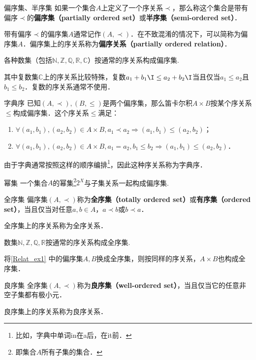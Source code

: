 \begin{definition}{偏序集、半序集}
如果一个集合$A$上定义了一个序关系$\prec$，那么称这个集合是带有偏序$\prec$的\textbf{偏序集（partially ordered set）}或\textbf{半序集（semi-ordered set）}．
\end{definition}

带有偏序$\prec$的偏序集$A$通常记作$(A,\prec)$．在不致混淆的情况下，可以简称为偏序集$A$．偏序集上的序关系称为\textbf{偏序关系（partially ordered relation）}．

\begin{example}{}
各种数集（包括$\mathbb{N},\mathbb{Z},\mathbb{Q},\mathbb{R},\mathbb{C}$）按通常的序关系构成偏序集.

其中复数集$\mathbb{C}$上的序关系比较特殊，复数$a_1+b_1\I \leq a_2+b_2\I$当且仅当$a_1\leq a_2$且$b_1 \leq b_2$．复数的序关系通常不使用．
\end{example}
\begin{example}{字典序}\label{Relat_ex1}
已知$(A,\prec),(B,\leq)$是两个偏序集，那么笛卡尔积$A\times B$按某个序关系$\leqslant$构成偏序集．这个序关系$\leqslant$满足：
\begin{enumerate}
\item $\forall(a_1,b_1),(a_2,b_2) \in A\times B, a_1\prec a_2 \Rightarrow (a_1,b_1)\leqslant(a_2,b_2)$；
\item $\forall(a_1,b_1),(a_2,b_2) \in A\times B, a_1=a_2, b_1\leq b_2 \Rightarrow (a_1,b_1) \leqslant (a_2, b_2)$．
\end{enumerate}

由于字典通常按照这样的顺序编排\footnote{比如，字典中单词in在a后，在it前．}，因此这种序关系称为字典序．
\end{example}
\begin{example}{幂集}
一个集合$A$的幂集\footnote{即集合$A$所有子集的集合．}$2^X$与子集关系一起构成偏序集.
\end{example}

\begin{definition}{全序集}
偏序集$(A,\prec)$称为\textbf{全序集（totally ordered set）}或\textbf{有序集（ordered set）}，当且仅当对任意$a,b \in A$，$a \prec b$或$b \prec a$．
\end{definition}
全序集上的序关系称为全序关系．
\begin{example}{}
数集$\mathbb{N},\mathbb{Z},\mathbb{Q},\mathbb{R}$按通常的序关系构成全序集.
\end{example}
\begin{example}{}
将\autoref{Relat_ex1} 中的偏序集$A,B$换成全序集，则按同样的序关系，$A\times B$也构成全序集．
\end{example}

\begin{definition}{良序集}
全序集$(A,\prec)$称为\textbf{良序集（well-ordered set）}，当且仅当它的任意非空子集都有极小元．
\end{definition}

良序集上的序关系称为良序关系．